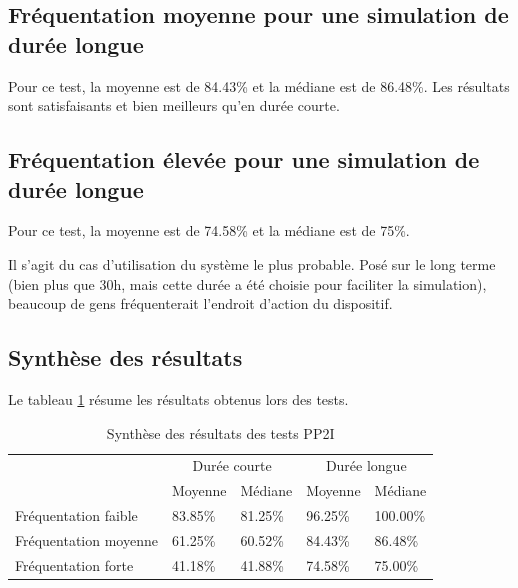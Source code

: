 \subsection{Fréquentation moyenne pour une simulation de durée longue}
Pour ce test, la moyenne est de 84.43\% et la médiane est de 86.48\%.
Les résultats sont satisfaisants et bien meilleurs qu'en durée courte.

\subsection{Fréquentation élevée pour une simulation de durée longue}
Pour ce test, la moyenne est de 74.58\% et la médiane est de 75\%.

Il s'agit du cas d'utilisation du système le plus probable. 
Posé sur le long terme (bien plus que 30h, mais cette durée a été choisie pour faciliter la simulation), beaucoup de gens fréquenterait l'endroit d'action du dispositif.

\subsection{Synthèse des résultats}

Le tableau \ref{tab:synthese_pp2i} résume les résultats obtenus lors des tests.

\begin{table}[H]
    \begin{tabular}{lllll}
                          & \multicolumn{2}{c}{Durée courte} & \multicolumn{2}{c}{Durée longue} \\
                          & Moyenne         & Médiane        & Moyenne        & Médiane         \\
    Fréquentation faible  & 83.85\%         & 81.25\%        & 96.25\%        & 100.00\%        \\
    Fréquentation moyenne & 61.25\%         & 60.52\%        & 84.43\%        & 86.48\%         \\
    Fréquentation forte   & 41.18\%         & 41.88\%        & 74.58\%        & 75.00\%        
    \end{tabular}
\caption{Synthèse des résultats des tests PP2I}
\label{tab:synthese_pp2i}
\end{table}

